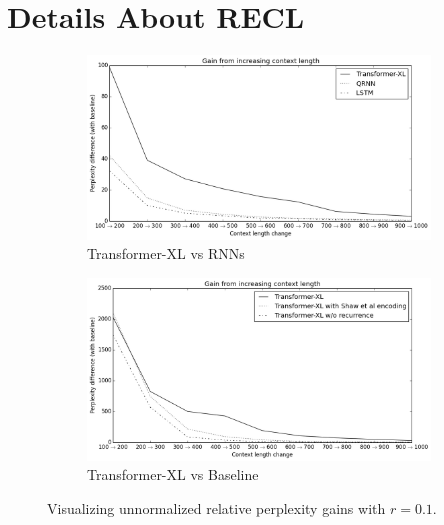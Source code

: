 \section{Details About RECL} \label{sec:recl}
\begin{figure}[!h]
	\begin{subfigure}[b]{0.5\textwidth}
		\includegraphics[width=\textwidth]{FIG/compare0.png}
		\caption{Transformer-XL vs RNNs}
		\label{fig:vsrnn}
	\end{subfigure}
	\begin{subfigure}[b]{0.5\textwidth}
		\includegraphics[width=\textwidth]{FIG/compare1.png}
		\caption{Transformer-XL vs Baseline}
		\label{fig:vsbase}
	\end{subfigure}
	\caption{Visualizing unnormalized relative perplexity gains with $r = 0.1$.}
	\label{fig:gain}
\end{figure}

